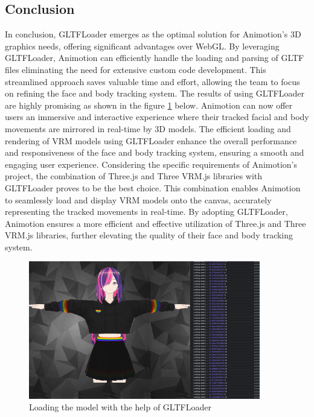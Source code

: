 \subsection{Conclusion}
In conclusion, GLTFLoader emerges as the optimal solution for Animotion's 3D graphics needs, 
offering significant advantages over WebGL. By leveraging GLTFLoader, Animotion can efficiently 
handle the loading and parsing of GLTF files
eliminating the need for extensive custom code development. This streamlined approach saves valuable 
time and effort, allowing the team to focus on refining the face and body tracking system.
The results of using GLTFLoader are highly promising as shown in the figure \ref{fig:gltfloader} below. 
Animotion can now offer users an immersive and 
interactive experience where their tracked facial and body movements are mirrored in real-time by 3D models. 
The efficient loading and rendering of VRM models using GLTFLoader enhance the overall performance and 
responsiveness of the face and body tracking system, ensuring a smooth and engaging user experience.
Considering the specific requirements of Animotion's project, the combination of Three.js and Three VRM.js 
libraries with GLTFLoader proves to be the best choice. This combination enables Animotion to seamlessly 
load and display VRM models onto the canvas, accurately representing the tracked movements in real-time. 
By adopting GLTFLoader, Animotion ensures a more efficient and effective utilization of Three.js 
and Three VRM.js libraries, further elevating the quality of their face and body tracking system.
\\
\begin{figure}[htb]
    \centering
    \includegraphics[width=0.9\textwidth]{pics/GLTFLoader.png}
    \caption{Loading the model with the help of GLTFLoader}
    \label{fig:gltfloader}
\end{figure}
\newpage
